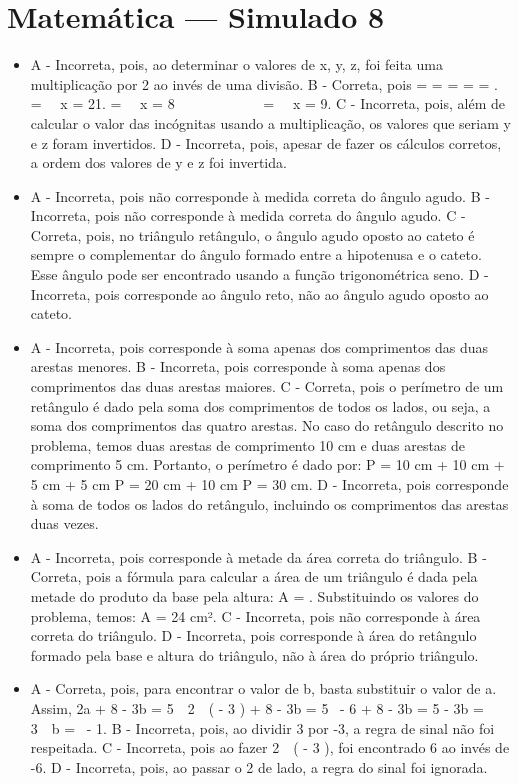 \section*{Matemática — Simulado 8} 
\begin{itemize}
\item A - Incorreta, pois, ao determinar o valores de x, y, z, foi feita uma
multiplicação por 2 ao invés de uma divisão.
B - Correta, pois  =  =  =  =  = .  =  \rightarrow \ \ x = 21.  =  \rightarrow \ \ x = 8\ \ \ \ \ \ \ \ \ \ \ \  =  \rightarrow \ \ x = 9.
C - Incorreta, pois, além de calcular o valor das incógnitas usando a
multiplicação, os valores que seriam y e z foram invertidos.
D - Incorreta, pois, apesar de fazer os cálculos corretos, a ordem dos
valores de y e z foi invertida.
\item A - Incorreta, pois não corresponde à medida correta do ângulo agudo.
B - Incorreta, pois não corresponde à medida correta do ângulo agudo.
C - Correta, pois, no triângulo retângulo, o ângulo agudo oposto ao
cateto é sempre o complementar do ângulo formado entre a hipotenusa e o
cateto. Esse ângulo pode ser encontrado usando a função trigonométrica
seno.
D - Incorreta, pois corresponde ao ângulo reto, não ao ângulo agudo
oposto ao cateto.
\item A - Incorreta, pois corresponde à soma apenas dos comprimentos das duas
arestas menores.
B - Incorreta, pois corresponde à soma apenas dos comprimentos das duas
arestas maiores.
C - Correta, pois o perímetro de um retângulo é dado pela soma dos
comprimentos de todos os lados, ou seja, a soma dos comprimentos das
quatro arestas.
No caso do retângulo descrito no problema, temos duas arestas de
comprimento 10 cm e duas arestas de comprimento 5 cm. Portanto, o
perímetro é dado por: P = 10 cm + 10 cm + 5 cm + 5 cm P = 20 cm + 10 cm P = 30 cm. 
D - Incorreta, pois corresponde à soma de todos os lados do retângulo,
incluindo os comprimentos das arestas duas vezes.
\item A - Incorreta, pois corresponde à metade da área correta do triângulo.
B - Correta, pois a fórmula para calcular a área de um triângulo é dada
pela metade do produto da base pela altura: A =
. Substituindo os valores do problema, temos: A = 24 cm².
C - Incorreta, pois não corresponde à área correta do triângulo.
D - Incorreta, pois corresponde à área do retângulo formado pela base e
altura do triângulo, não à área do próprio triângulo.
\item A - Correta, pois, para encontrar o valor de b, basta substituir o valor
de a. Assim, 2a + 8 - 3b = 5\  \rightarrow \ 2\  \times \ \left( - 3 \right) + 8 - 3b = 5 \rightarrow \  - 6 + 8 - 3b = 5 - 3b = 3\  \rightarrow \ b = \  - 1.
B - Incorreta, pois, ao dividir 3 por -3, a regra de sinal não foi
respeitada.
C - Incorreta, pois ao fazer 2\  \times \ \left( - 3 \right), foi
encontrado 6 ao invés de -6.
D - Incorreta, pois, ao passar o 2 de lado, a regra do sinal foi
ignorada.
\end{itemize}